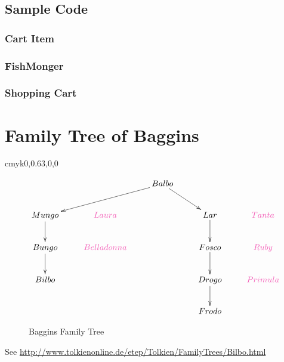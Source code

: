 \cleardoublepage
\section {Sample Code}
\subsection {Cart Item}

\cleardoublepage
\subsection {FishMonger}

\cleardoublepage
\subsection {Shopping Cart}























\chapter{Family Tree of Baggins}
\definecolor {CarnationPink} {cmyk}{0,0.63,0,0}
\begin{figure}[!hbp]
\center
	\begin {displaymath}
	\xymatrix {
	&& Balbo\ar[dll] \ar[dr]\\
Mungo \ar [d] &	\textcolor{CarnationPink} {Laura}	&& Lar \ar[d] & \textcolor{CarnationPink} {Tanta}\\
Bungo \ar[d] &  \textcolor{CarnationPink} {Belladonna}	&& Fosco \ar[d]& \textcolor{CarnationPink} {Ruby}\\
Bilbo					&&& Drogo\ar[d] & \textcolor{CarnationPink} {Primula} \\
							&&& Frodo
}	\end {displaymath}
\caption{Baggins Family Tree}
\end{figure}
\par
See \href {http://www.tolkienonline.de/etep/Tolkien/FamilyTrees/Bilbo.html} {http://www.tolkienonline.de/etep/Tolkien/FamilyTrees/Bilbo.html}

